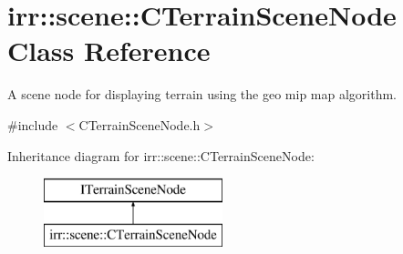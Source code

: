 \hypertarget{classirr_1_1scene_1_1_c_terrain_scene_node}{\section{irr\-:\-:scene\-:\-:C\-Terrain\-Scene\-Node Class Reference}
\label{classirr_1_1scene_1_1_c_terrain_scene_node}
}


A scene node for displaying terrain using the geo mip map algorithm.  




{\ttfamily \#include $<$C\-Terrain\-Scene\-Node.\-h$>$}

Inheritance diagram for irr\-:\-:scene\-:\-:C\-Terrain\-Scene\-Node\-:\begin{figure}[H]
\begin{center}
\leavevmode
\includegraphics[height=2.000000cm]{classirr_1_1scene_1_1_c_terrain_scene_node}
\end{center}
\end{figure}
